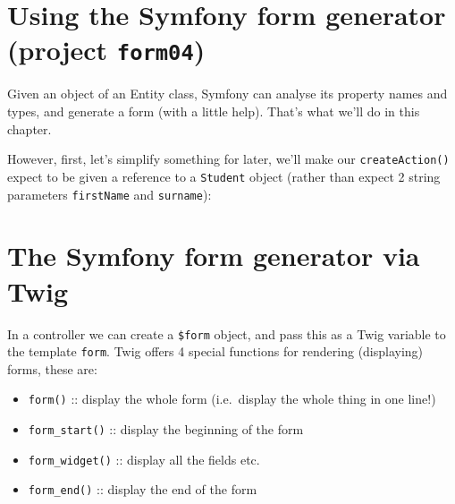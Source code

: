 \documentclass[a4paperpaper,openright]{book}
\newenvironment{Shaded}{}{}
\newcommand{\FunctionTok}[1]{\textcolor[rgb]{0.02,0.16,0.49}{#1}}
\newcommand{\KeywordTok}[1]{\textcolor[rgb]{0.00,0.44,0.13}{\textbf{#1}}}
\newcommand{\NormalTok}[1]{#1}
\newcommand{\OtherTok}[1]{\textcolor[rgb]{0.00,0.44,0.13}{#1}}
\newcommand{\StringTok}[1]{\textcolor[rgb]{0.25,0.44,0.63}{#1}}
\providecommand{\tightlist}{%
  \setlength{\itemsep}{0pt}\setlength{\parskip}{0pt}}
\begin{document}
\hypertarget{using-the-symfony-form-generator-project-form04}{%
\section{\texorpdfstring{Using the Symfony form generator (project
\texttt{form04})}{Using the Symfony form generator (project form04)}}\label{using-the-symfony-form-generator-project-form04}}

Given an object of an Entity class, Symfony can analyse its property
names and types, and generate a form (with a little help). That's what
we'll do in this chapter.

However, first, let's simplify something for later, we'll make our
\texttt{createAction()} expect to be given a reference to a
\texttt{Student} object (rather than expect 2 string parameters
\texttt{firstName} and \texttt{surname}):

\begin{Shaded}
\end{Shaded}

\hypertarget{the-symfony-form-generator-via-twig}{%
\section{The Symfony form generator via
Twig}\label{the-symfony-form-generator-via-twig}}

In a controller we can create a \texttt{\$form} object, and pass this as
a Twig variable to the template \texttt{form}. Twig offers 4 special
functions for rendering (displaying) forms, these are:

\begin{itemize}
\tightlist
\item
  \texttt{form()} :: display the whole form (i.e.~display the whole
  thing in one line!)
\item
  \texttt{form\_start()} :: display the beginning of the form
\item
  \texttt{form\_widget()} :: display all the fields etc.
\item
  \texttt{form\_end()} :: display the end of the form
\end{itemize}
\end{document}
